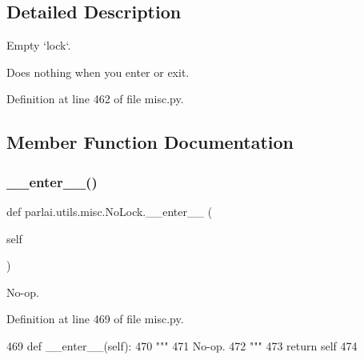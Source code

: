 \subsection{Detailed Description}
\begin{DoxyVerb}Empty `lock`.

Does nothing when you enter or exit.
\end{DoxyVerb}
 

Definition at line 462 of file misc.\+py.



\subsection{Member Function Documentation}
\mbox{\label{classparlai_1_1utils_1_1misc_1_1NoLock_a8b86612989f12c74a104aedfb85d41ef}} 
\subsubsection{\texorpdfstring{\+\_\+\+\_\+enter\+\_\+\+\_\+()}{\_\_enter\_\_()}}
{\footnotesize\ttfamily def parlai.\+utils.\+misc.\+No\+Lock.\+\_\+\+\_\+enter\+\_\+\+\_\+ (\begin{DoxyParamCaption}\item[{}]{self }\end{DoxyParamCaption})}

\begin{DoxyVerb}No-op.
\end{DoxyVerb}
 

Definition at line 469 of file misc.\+py.


\begin{DoxyCode}
469     \textcolor{keyword}{def }\_\_enter\_\_(self):
470         \textcolor{stringliteral}{"""}
471 \textcolor{stringliteral}{        No-op.}
472 \textcolor{stringliteral}{        """}
473         \textcolor{keywordflow}{return} self
474 
\end{DoxyCode}
\mbox{\label{classparlai_1_1utils_1_1misc_1_1NoLock_a4f7170fad1283a391068f0b403734502}} 
